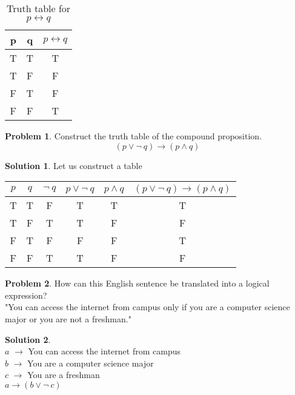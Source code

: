 \documentclass[12pt,oneside,a4paper]{book}
\theoremstyle{remark}
\theoremstyle{definition}
\newtheorem{prob}{Problem}[section]
\newtheorem*{soln}{Solution}
\begin{document}
\begin{table}[H]
    \centering
    \begin{tabular}{|c|c|c|}
        \hline
        p & q & \(p\leftrightarrow q\) \\ \hline
        T & T & T                      \\ \hline
        T & F & F                      \\ \hline
        F & T & F                      \\ \hline
        F & F & T                      \\ \hline
    \end{tabular}
    \caption{Truth table for \(p\leftrightarrow q\)}
\end{table}
\begin{prob}
    Construct the truth table of the compound proposition.\[(p\vee \neg\ q)\to (p\wedge q)\]
\end{prob}
\begin{soln}
    Let us construct a table
    \begin{center}
        \begin{tabular}{|c|c|c|c|c|c|}
            \hline
            $ p $ & $ q $ & \(\neg\ q\) & \(p\vee \neg\ q\) & \(p \wedge q\) & \((p\vee \neg\ q)\to (p\wedge q)\) \\ \hline
            T     & T     & F           & T                 & T              & T                                  \\ \hline
            T     & F     & T           & T                 & F              & F                                  \\ \hline
            F     & T     & F           & F                 & F              & T                                  \\ \hline
            F     & F     & T           & T                 & F              & F                                  \\ \hline
        \end{tabular}
    \end{center}
\end{soln}
\begin{prob}
    How can this English sentence be translated into a logical expression?\\
    "You can access the internet from campus only if you are a computer science major or you are not a freshman."
\end{prob}
\begin{soln}
    \hfill\\
    \indent$ a $ \(\to\) You can access the internet from campus\\
    \indent$ b $ \(\to\) You are a computer science major\\
    \indent$ c $ \(\to\) You are a freshman\\
    \indent\(a\to(b\vee\neg\ c)\)
\end{soln}
\end{document}
